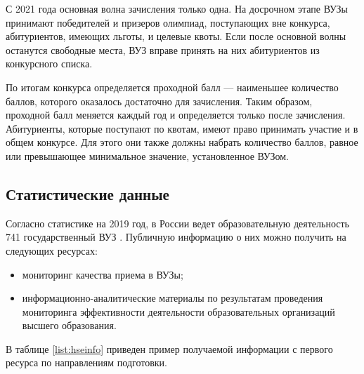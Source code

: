 С 2021 года основная волна зачисления только одна\cite{prikaz1}. На досрочном этапе ВУЗы принимают победителей и призеров олимпиад, поступающих вне конкурса, абитуриентов, имеющих льготы, и целевые квоты. Если после основной волны останутся свободные места, ВУЗ вправе принять на них абитуриентов из конкурсного списка.

По итогам конкурса определяется проходной балл — наименьшее количество баллов, которого оказалось достаточно для зачисления. Таким образом, проходной балл меняется каждый год и определяется только после зачисления. Абитуриенты, которые поступают по квотам, имеют право принимать участие и в общем конкурсе. Для этого они также должны набрать количество баллов, равное или превышающее минимальное значение, установленное ВУЗом.

\subsection{Статистические данные}

Согласно статистике на 2019 год, в России ведет образовательную деятельность 741 государственный ВУЗ \cite{stat}. Публичную информацию о них можно получить на следующих ресурсах:

\begin{itemize}[leftmargin=1.6\parindent]
	\item мониторинг качества приема в ВУЗы\cite{hse};
	\item информационно-аналитические материалы по результатам проведения мониторинга
эффективности деятельности образовательных организаций высшего образования\cite{miccedu}.

\end{itemize}

В таблице \ref{list:hseinfo} приведен пример получаемой информации с первого ресурса по направлениям подготовки.

